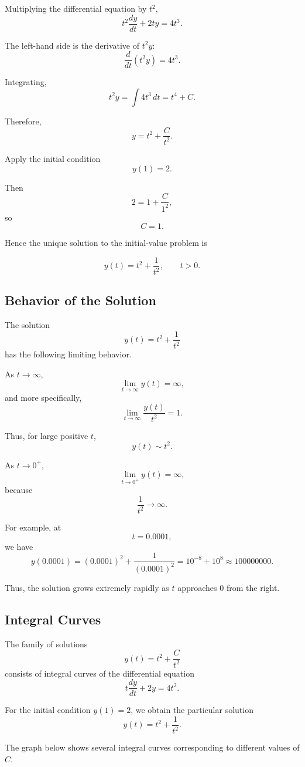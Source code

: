 \documentclass[11pt]{article}
\begin{document}
Multiplying the differential equation by \(t^2\),
\[
t^2\frac{dy}{dt}+2ty
=
4t^3.
\]

The left-hand side is the derivative of \(t^2y\):
\[
\frac{d}{dt}\left(t^2y\right)
=
4t^3.
\]

Integrating,
\[
t^2y
=
\int 4t^3\,dt
=
t^4+C.
\]

Therefore,
\[
y
=
t^2+\frac{C}{t^2}.
\]

Apply the initial condition
\[
y(1)=2.
\]

Then
\[
2
=
1+\frac{C}{1^2},
\]
so
\[
C=1.
\]

Hence the unique solution to the initial-value problem is

\[
\boxed{
y(t)=t^2+\frac{1}{t^2}
},
\qquad t>0.
\]

\subsection{Behavior of the Solution}

The solution
\[
y(t)=t^2+\frac{1}{t^2}
\]
has the following limiting behavior.

As \(t\to\infty\),
\[
\lim_{t\to\infty}y(t)
=
\infty,
\]
and more specifically,
\[
\lim_{t\to\infty}\frac{y(t)}{t^2}=1.
\]

Thus, for large positive \(t\),
\[
y(t)\sim t^2.
\]

As \(t\to0^+\),
\[
\lim_{t\to0^+}y(t)
=
\infty,
\]
because
\[
\frac{1}{t^2}\to\infty.
\]

For example, at
\[
t=0.0001,
\]
we have
\[
y(0.0001)
=
(0.0001)^2+\frac{1}{(0.0001)^2}
=
10^{-8}+10^8
\approx 100000000.
\]

Thus, the solution grows extremely rapidly as \(t\) approaches \(0\) from
the right.

\subsection{Integral Curves}

The family of solutions
\[
y(t)=t^2+\frac{C}{t^2}
\]
consists of integral curves of the differential equation
\[
t\frac{dy}{dt}+2y=4t^2.
\]

For the initial condition \(y(1)=2\), we obtain the particular solution
\[
y(t)=t^2+\frac{1}{t^2}.
\]

The graph below shows several integral curves corresponding to different
values of \(C\).
\end{document}
